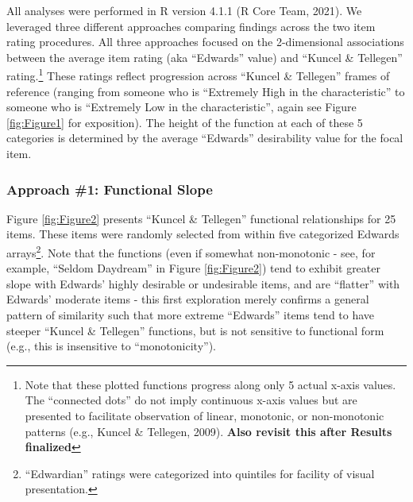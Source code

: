 \documentclass[
  ,jou]{apa6}
\begin{document}
All analyses were performed in R version 4.1.1 (R Core Team, 2021). We leveraged three different approaches comparing findings across the two item rating procedures. All three approaches focused on the 2-dimensional associations between the average item rating (aka ``Edwards'' value) and ``Kuncel \& Tellegen'' rating.\footnote{Note that these plotted functions progress along only 5 actual x-axis values. The ``connected dots'' do not imply continuous x-axis values but are presented to facilitate observation of linear, monotonic, or non-monotonic patterns (e.g., Kuncel \& Tellegen, 2009). \textbf{Also revisit this after Results finalized}} These ratings reflect progression across ``Kuncel \& Tellegen'' frames of reference (ranging from someone who is ``Extremely High in the characteristic'' to someone who is ``Extremely Low in the characteristic'', again see Figure \ref{fig:Figure1} for exposition). The height of the function at each of these 5 categories is determined by the average ``Edwards'' desirability value for the focal item.

\hypertarget{approach-1-functional-slope}{%
\subsubsection{Approach \#1: Functional Slope}\label{approach-1-functional-slope}}

Figure \ref{fig:Figure2} presents ``Kuncel \& Tellegen'' functional relationships for 25 items. These items were randomly selected from within five categorized Edwards arrays\footnote{``Edwardian'' ratings were categorized into quintiles for facility of visual presentation.}. Note that the functions (even if somewhat non-monotonic - see, for example, ``Seldom Daydream'' in Figure \ref{fig:Figure2}) tend to exhibit greater slope with Edwards' highly desirable or undesirable items, and are ``flatter'' with Edwards' moderate items - this first exploration merely confirms a general pattern of similarity such that more extreme ``Edwards'' items tend to have steeper ``Kuncel \& Tellegen'' functions, but is not sensitive to functional form (e.g., this is insensitive to ``monotonicity'').
\end{document}
